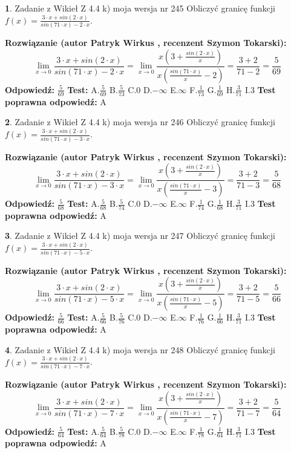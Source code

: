 \documentclass[12pt, a4paper]{article}
\theoremstyle{definition} %
\newtheorem{zad}{}
\newcommand{\zadStart}[1]{\begin{zad}#1\newline}
\newcommand{\zadStop}{\end{zad}}
\newcommand{\rozwStart}[2]{\noindent \textbf{Rozwiązanie (autor #1 , recenzent #2): }\newline}
\newcommand{\rozwStop}{\newline}
\newcommand{\odpStart}{\noindent \textbf{Odpowiedź:}\newline}
\newcommand{\odpStop}{\newline}
\newcommand{\testStart}{\noindent \textbf{Test:}\newline}
\newcommand{\testStop}{\newline}
\newcommand{\kluczStart}{\noindent \textbf{Test poprawna odpowiedź:}\newline}
\newcommand{\kluczStop}{\newline}
\begin{document}
\zadStart{Zadanie z Wikieł Z 4.4 k) moja wersja nr 245}
Obliczyć granicę funkcji $f(x)=\frac{3\cdot x +sin(2\cdot x)}{sin(71\cdot x) -2\cdot x}$.
\zadStop
\rozwStart{Patryk Wirkus}{Szymon Tokarski}
$$\lim\limits_{x\to 0}\frac{3\cdot x +sin(2\cdot x)}{sin(71\cdot x) -2\cdot x}
=\lim\limits_{x\to 0}\frac{x(3+\frac{sin(2\cdot x)}{x})}{x(\frac{sin(71\cdot x)}{x}-2)}
=\frac{3+2}{71-2} = \frac{5}{69}$$
\rozwStop
\odpStart
$\frac{5}{69}$
\odpStop
\testStart
A.$\frac{5}{69}$
B.$\frac{5}{73}$
C.$0$
D.$-\infty$
E.$\infty$
F.$\frac{1}{73}$
G.$\frac{1}{69}$
H.$\frac{3}{71}$
I.$3$
\testStop
\kluczStart
A
\kluczStop



\zadStart{Zadanie z Wikieł Z 4.4 k) moja wersja nr 246}
Obliczyć granicę funkcji $f(x)=\frac{3\cdot x +sin(2\cdot x)}{sin(71\cdot x) -3\cdot x}$.
\zadStop
\rozwStart{Patryk Wirkus}{Szymon Tokarski}
$$\lim\limits_{x\to 0}\frac{3\cdot x +sin(2\cdot x)}{sin(71\cdot x) -3\cdot x}
=\lim\limits_{x\to 0}\frac{x(3+\frac{sin(2\cdot x)}{x})}{x(\frac{sin(71\cdot x)}{x}-3)}
=\frac{3+2}{71-3} = \frac{5}{68}$$
\rozwStop
\odpStart
$\frac{5}{68}$
\odpStop
\testStart
A.$\frac{5}{68}$
B.$\frac{5}{74}$
C.$0$
D.$-\infty$
E.$\infty$
F.$\frac{1}{74}$
G.$\frac{1}{68}$
H.$\frac{3}{71}$
I.$3$
\testStop
\kluczStart
A
\kluczStop



\zadStart{Zadanie z Wikieł Z 4.4 k) moja wersja nr 247}
Obliczyć granicę funkcji $f(x)=\frac{3\cdot x +sin(2\cdot x)}{sin(71\cdot x) -5\cdot x}$.
\zadStop
\rozwStart{Patryk Wirkus}{Szymon Tokarski}
$$\lim\limits_{x\to 0}\frac{3\cdot x +sin(2\cdot x)}{sin(71\cdot x) -5\cdot x}
=\lim\limits_{x\to 0}\frac{x(3+\frac{sin(2\cdot x)}{x})}{x(\frac{sin(71\cdot x)}{x}-5)}
=\frac{3+2}{71-5} = \frac{5}{66}$$
\rozwStop
\odpStart
$\frac{5}{66}$
\odpStop
\testStart
A.$\frac{5}{66}$
B.$\frac{5}{76}$
C.$0$
D.$-\infty$
E.$\infty$
F.$\frac{1}{76}$
G.$\frac{1}{66}$
H.$\frac{3}{71}$
I.$3$
\testStop
\kluczStart
A
\kluczStop



\zadStart{Zadanie z Wikieł Z 4.4 k) moja wersja nr 248}
Obliczyć granicę funkcji $f(x)=\frac{3\cdot x +sin(2\cdot x)}{sin(71\cdot x) -7\cdot x}$.
\zadStop
\rozwStart{Patryk Wirkus}{Szymon Tokarski}
$$\lim\limits_{x\to 0}\frac{3\cdot x +sin(2\cdot x)}{sin(71\cdot x) -7\cdot x}
=\lim\limits_{x\to 0}\frac{x(3+\frac{sin(2\cdot x)}{x})}{x(\frac{sin(71\cdot x)}{x}-7)}
=\frac{3+2}{71-7} = \frac{5}{64}$$
\rozwStop
\odpStart
$\frac{5}{64}$
\odpStop
\testStart
A.$\frac{5}{64}$
B.$\frac{5}{78}$
C.$0$
D.$-\infty$
E.$\infty$
F.$\frac{1}{78}$
G.$\frac{1}{64}$
H.$\frac{3}{71}$
I.$3$
\testStop
\kluczStart
A
\kluczStop
\end{document}

